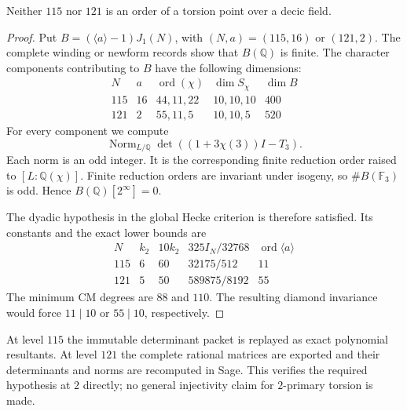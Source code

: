 \begin{proposition}\label{prop:dyadic-global}
Neither $115$ nor $121$ is an order of a torsion point over a decic field.
\end{proposition}
\begin{proof}
Put $B=(\langle a\rangle-1)J_1(N)$, with $(N,a)=(115,16)$ or $(121,2)$.
The complete winding or newform records show that $B(\mathbb Q)$ is finite.
The character components contributing to $B$ have the following dimensions:
\[
\begin{array}{c|c|c|c|c}
N&a&\operatorname{ord}(\chi)&\dim S_\chi&\dim B\\\hline
115&16&44,11,22&10,10,10&400\\
121&2&55,11,5&10,10,5&520
\end{array}
\]
For every component we compute
\[
 \operatorname{Norm}_{L/\mathbb Q}
 \det((1+3\chi(3))I-T_3).
\]
Each norm is an odd integer. It is the corresponding finite reduction
order raised to $[L:\mathbb Q(\chi)]$. Finite reduction orders are invariant
under isogeny, so $\#B(\mathbb F_3)$ is odd. Hence
$B(\mathbb Q)[2^\infty]=0$.

The dyadic hypothesis in the global Hecke criterion is therefore
satisfied. Its constants and the exact lower bounds are
\[
\begin{array}{c|c|c|c|c}
N&k_2&10k_2&325I_N/32768&\operatorname{ord}\langle a\rangle\\\hline
115&6&60&32175/512&11\\
121&5&50&589875/8192&55
\end{array}
\]
The minimum CM degrees are $88$ and $110$. The resulting diamond
invariance would force $11\mid10$ or $55\mid10$, respectively.
\end{proof}

At level $115$ the immutable determinant packet is replayed as exact
polynomial resultants. At level $121$ the complete rational matrices
are exported and their determinants and norms are recomputed in Sage.
This verifies the required hypothesis at $2$ directly; no general
injectivity claim for $2$-primary torsion is made.
